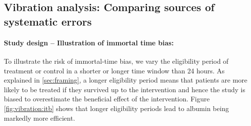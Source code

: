 \documentclass[10pt,letterpaper]{article}
\begin{document}
\subsection*{Vibration analysis: Comparing sources of systematic errors}%
\label{sec:vibration_analysis_mimic_iv}


\paragraph{Study design -- Illustration of immortal time bias:}

To illustrate the risk of immortal-time bias, we vary the eligibility period of
treatment or control in a shorter or longer time window than 24 hours. As
explained in \autoref{sec:framing}, a longer eligibility period means that
patients are more likely to be treated if they survived up to the intervention
and hence the study is biased to overestimate the beneficial effect of the
intervention. Figure \ref{fig:vibration:itb} shows that longer eligibility
periods lead to albumin being markedly more efficient.
\end{document}
